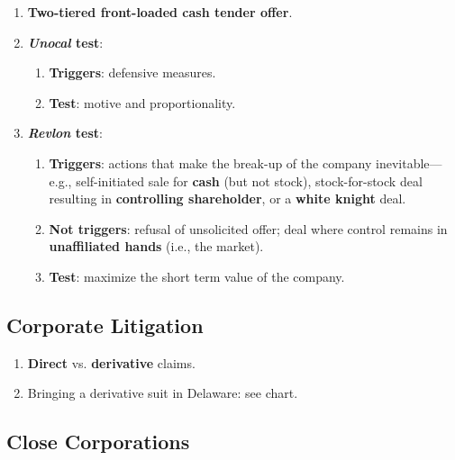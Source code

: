 \begin{enumerate}
    \item \textbf{Two-tiered front-loaded cash tender offer}.
    \item \textbf{\emph{Unocal} test}:
    \begin{enumerate}
        \item \textbf{Triggers}: defensive measures.
        \item \textbf{Test}: motive and proportionality.
    \end{enumerate}
    \item \textbf{\emph{Revlon} test}:
    \begin{enumerate}
        \item \textbf{Triggers}: actions that make the break-up of the company 
        inevitable---e.g., self-initiated sale for \textbf{cash} (but not 
        stock), stock-for-stock deal resulting in \textbf{controlling 
        shareholder}, or a \textbf{white knight} deal.
        \item \textbf{Not triggers}: refusal of unsolicited offer; deal where 
        control remains in \textbf{unaffiliated hands} (i.e., the market).
        \item \textbf{Test}: maximize the short term value of the company.
    \end{enumerate}
\end{enumerate}

\newpage

\subsection{Corporate Litigation}

\begin{enumerate}
    \item \textbf{Direct} vs. \textbf{derivative} claims.
    \item Bringing a derivative suit in Delaware: see chart.
\end{enumerate}

\newpage

\subsection{Close Corporations}


